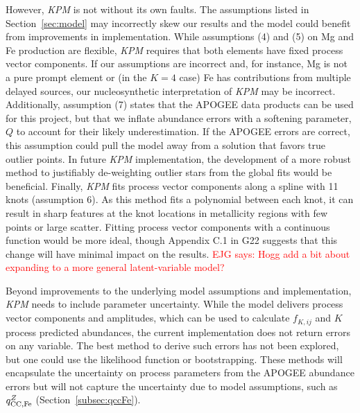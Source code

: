 \documentclass[modern]{aastex631}
\newcommand{\qccFe}{q_{{\rm CC, Fe}}^{Z}}
\newcommand{\ejg}[1]{\textcolor{red}{EJG says: #1}}
\newcommand{\name}{\textsl{KPM}}
\begin{document}
However, \name{} is not without its own faults. The assumptions listed in Section~\ref{sec:model} may incorrectly skew our results and the model could benefit from improvements in implementation. While assumptions (4) and (5) on Mg and Fe production are flexible, \name{} requires that both elements have fixed process vector components. If our assumptions are incorrect and, for instance, Mg is not a pure prompt element or (in the $K=4$ case)  Fe has contributions from multiple delayed sources, our nucleosynthetic interpretation of \name{} may be incorrect. Additionally, assumption (7) states that the APOGEE data products can be used for this project, but that we inflate abundance errors with a softening parameter, $Q$ to account for their likely underestimation. If the APOGEE errors are correct, this assumption could pull the model away from a solution that favors true outlier points. In future \name{} implementation, the development of a more robust method to justifiably de-weighting outlier stars from the global fits would be beneficial. Finally, \name{} fits process vector components along a spline with 11 knots (assumption 6). As this method fits a polynomial between each knot, it can result in sharp features at the knot locations in metallicity regions with few points or large scatter. Fitting process vector components with a continuous function would be more ideal, though Appendix C.1 in G22 suggests that this change will have minimal impact on the results. 
\ejg{Hogg add a bit about expanding to a more general latent-variable model?}

Beyond improvements to the underlying model assumptions and implementation, \name{} needs to include parameter uncertainty. While the model delivers process vector components and amplitudes, which can be used to calculate $f_{K, ij}$ and $K$ process predicted abundances, the current implementation does not return errors on any variable. The best method to derive such errors has not been explored, but one could use the likelihood function or bootstrapping. These methods will encapsulate the uncertainty on process parameters from the APOGEE abundance errors but will not capture the uncertainty due to model assumptions, such as $\qccFe$ (Section~\ref{subsec:qccFe}). 
\end{document}
